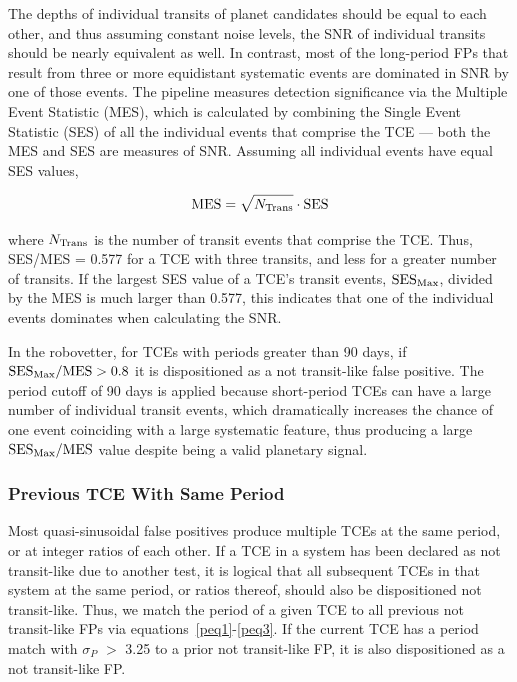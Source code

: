 The depths of individual transits of planet candidates should be equal to each other, and thus assuming constant noise levels, the SNR of individual transits should be nearly equivalent as well. In contrast, most of the long-period FPs that result from three or more equidistant systematic events are dominated in SNR by one of those events. The \kepler{} pipeline measures detection significance via the Multiple Event Statistic (MES), which is calculated by combining the Single Event Statistic (SES) of all the individual events that comprise the TCE --- both the MES and SES are measures of SNR. Assuming all individual events have equal SES values,

\begin{equation}
{\rm MES} = \sqrt{N_{\rm Trans}} \cdot {\rm SES}
\end{equation}

\noindent where $N_{\rm Trans}$ is the number of transit events that comprise the TCE. Thus, SES/MES = 0.577 for a TCE with three transits, and less for a greater number of transits. If the largest SES value of a TCE's transit events, ${\rm SES}_{\rm Max}$, divided by the MES is much larger than 0.577, this indicates that one of the individual events dominates when calculating the SNR.

In the robovetter, for TCEs with periods greater than 90 days, if ${{\rm SES}_{\rm Max} / {\rm MES} > 0.8}$ it is dispositioned as a not transit-like false positive. The period cutoff of 90 days is applied because short-period TCEs can have a large number of individual transit events, which dramatically increases the chance of one event coinciding with a large systematic feature, thus producing a large ${{\rm SES}_{\rm Max} / {\rm MES}}$ value despite being a valid planetary signal.



\subsubsection{Previous TCE With Same Period}
\label{s:sameperiod}
Most quasi-sinusoidal false positives produce multiple TCEs at the same period, or at integer ratios of each other. If a TCE in a system has been declared as not transit-like due to another test, it is logical that all subsequent TCEs in that system at the same period, or ratios thereof, should also be dispositioned not transit-like. Thus, we match the period of a given TCE to all previous not transit-like FPs via equations~\ref{peq1}-\ref{peq3}. If the current TCE has a period match with $\sigma_{P}$ $>$ 3.25 to a prior not transit-like FP, it is also dispositioned as a not transit-like FP.

